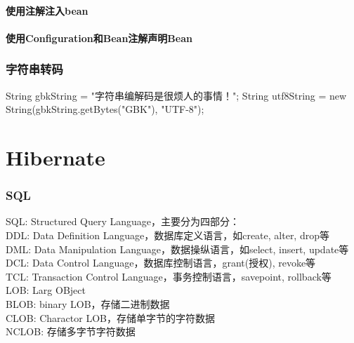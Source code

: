 \documentclass[a4paper,11pt]{article}
\begin{document}
\subsection[使用注解注入bean]{使用注解注入bean}

\subsection[使用Configuration和Bean注解声明Bean]{使用Configuration和Bean注解声明Bean}

\section[字符串转码]{字符串转码}
\begin{javacode}
  String gbkString = "字符串编解码是很烦人的事情！";
  String utf8String = new String(gbkString.getBytes("GBK"), "UTF-8");
\end{javacode}

\part[Hibernate]{Hibernate}

\section[SQL]{SQL}
SQL: Structured Query Language，主要分为四部分：\\[10pt]
DDL: Data Definition Language，数据库定义语言，如create, alter, drop等\\
DML: Data Manipulation Language，数据操纵语言，如select, insert, update等\\
DCL: Data Control Language，数据库控制语言，grant(授权), revoke等\\
TCL: Transaction Control Language，事务控制语言，savepoint, rollback等\\[10pt]

LOB: Larg OBject\\
BLOB: binary LOB，存储二进制数据\\
CLOB: Charactor LOB，存储单字节的字符数据\\
NCLOB: 存储多字节字符数据
\end{document}
